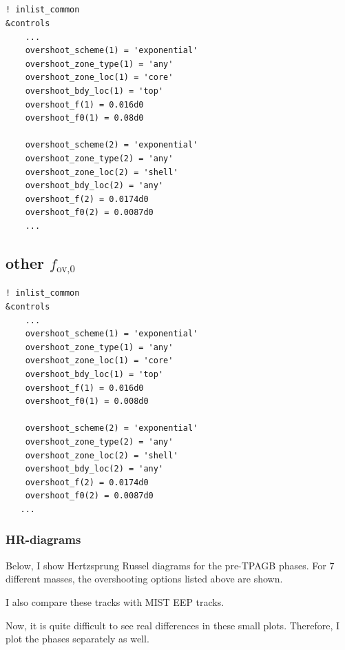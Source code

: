 \documentclass[a4paper,10pt]{article}
\begin{document}
\subsection{\texorpdfstring{\citet{temmink2022}}{Temmink et al. (2023)}}
\begin{verbatim}
! inlist_common
&controls
    ...
	overshoot_scheme(1) = 'exponential'
	overshoot_zone_type(1) = 'any'
	overshoot_zone_loc(1) = 'core'
	overshoot_bdy_loc(1) = 'top'
	overshoot_f(1) = 0.016d0
	overshoot_f0(1) = 0.08d0

	overshoot_scheme(2) = 'exponential'
	overshoot_zone_type(2) = 'any'
	overshoot_zone_loc(2) = 'shell'
	overshoot_bdy_loc(2) = 'any'
	overshoot_f(2) = 0.0174d0
	overshoot_f0(2) = 0.0087d0
    ...
\end{verbatim}

\subsection{\texorpdfstring{\citet{temmink2022}}{Temmink et al. (2023)} other \texorpdfstring{\(f_\text{ov,0}\)}{f\_ov,0}}
\begin{verbatim}
! inlist_common
&controls
    ...
	overshoot_scheme(1) = 'exponential'
	overshoot_zone_type(1) = 'any'
	overshoot_zone_loc(1) = 'core'
	overshoot_bdy_loc(1) = 'top'
	overshoot_f(1) = 0.016d0
	overshoot_f0(1) = 0.008d0

	overshoot_scheme(2) = 'exponential'
	overshoot_zone_type(2) = 'any'
	overshoot_zone_loc(2) = 'shell'
	overshoot_bdy_loc(2) = 'any'
	overshoot_f(2) = 0.0174d0
	overshoot_f0(2) = 0.0087d0
   ...
\end{verbatim}



\subsubsection{HR-diagrams}
Below, I show Hertzsprung Russel diagrams for the pre-TPAGB phases. For 7 different masses, the overshooting options listed above are shown.

I also compare these tracks with MIST \citep{choi2016} EEP tracks.

\begin{figure}[ht]
    \centering
\end{figure}

Now, it is quite difficult to see real differences in these small plots. Therefore, I plot the phases separately as well.
\end{document}
